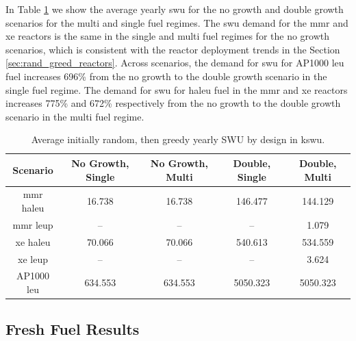
In Table \ref{tab:rand_greed_swu_avg} we show the average yearly \gls{swu} for the no growth and double growth scenarios for the multi and single fuel regimes. The \gls{swu} demand for the \gls{mmr} and \gls{xe} reactors is the same in the single and multi fuel regimes for the no growth scenarios, which is consistent with the reactor deployment trends in the Section \ref{sec:rand_greed_reactors}. Across scenarios, the demand for \gls{swu} for AP1000 \gls{leu} fuel increases 696\% from the no growth to the double growth scenario in the single fuel regime. The demand for \gls{swu} for \gls{haleu} fuel in the \gls{mmr} and \gls{xe} reactors increases 775\% and 672\% respectively from the no growth to the double growth scenario in the multi fuel regime.

\begin{table}[H]
    \centering
    \caption{Average initially random, then greedy yearly SWU by design in k\gls{swu}.}
    \label{tab:rand_greed_swu_avg}
    \begin{tabular}{c c c c c}
       \hline
       Scenario & No Growth, Single & No Growth, Multi & Double, Single & Double, Multi  \\
       \hline
       \gls{mmr} \gls{haleu}   & 16.738  & 16.738  & 146.477  & 144.129  \\
       \gls{mmr} \gls{leup}    & --      & --      & --       & 1.079    \\
       \gls{xe} \gls{haleu}    & 70.066  & 70.066  & 540.613  & 534.559  \\
       \gls{xe} \gls{leup}     & --      & --      & --       & 3.624    \\
       AP1000 \gls{leu}        & 634.553 & 634.553 & 5050.323 & 5050.323 \\
       \hline
    \end{tabular}
\end{table}



\subsection{Fresh Fuel Results}
\label{sec:rand_greed_fresh}


